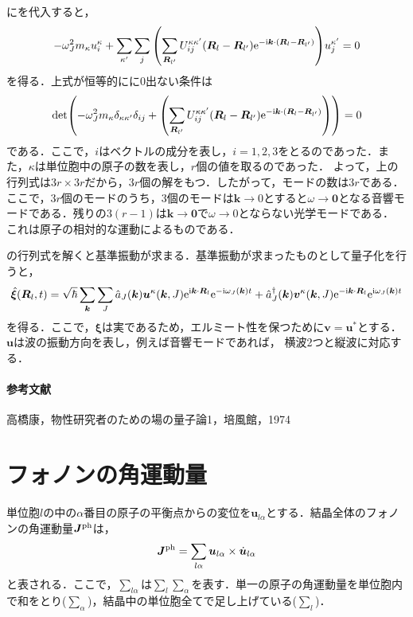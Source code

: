 \documentclass{report}
\begin{document}
にを代入すると，
\begin{align}
  -\omega_J^2 m_\kappa u_{i}^{\kappa} + \sum_{\kappa'} \sum_{j} \qty(\sum_{\bm{R}_{l'}} U_{ij}^{\kappa\kappa'}(\bm{R}_l - \bm{R}_{l'})\mathrm{e}^{-\mathrm{i}\bm{k}\cdot(\bm{R}_l-\bm{R}_{l'})}) u_j^{\kappa'}=0
\end{align}
を得る．上式が恒等的にに0出ない条件は
\begin{align}
  \det(-\omega_J^2 m_{\kappa}\delta_{\kappa\kappa'}\delta_{ij} + \qty(\sum_{\bm{R}_{l'}} U_{ij}^{\kappa\kappa'}(\bm{R}_l - \bm{R}_{l'})\mathrm{e}^{-\mathrm{i}\bm{k}\cdot(\bm{R}_l-\bm{R}_{l'})})) = 0 \label{det}
\end{align}
である．ここで，$i$はベクトルの成分を表し，$i=1,2,3$をとるのであった．また，$\kappa$は単位胞中の原子の数を表し，$r$個の値を取るのであった．
よって，上の行列式は$3r\times 3r$だから，$3r$個の解をもつ．したがって，モードの数は$3r$である．ここで，$3r$個のモードのうち，3個のモードは$\bm{k}\to0$とすると$\omega\to\bm{0}$となる音響モードである．残りの$3(r-1)$は$\bm{k}\to\bm{0}$で$\omega\to0$とならない光学モードである．
これは原子の相対的な運動によるものである．

の行列式を解くと基準振動が求まる．基準振動が求まったものとして量子化を行うと，
\begin{align}
  \hat{\bm{\xi}} (\bm{R}_l,t) = \sqrt{\hbar}\sum_{\bm{k}}\sum_{J} \hat{a}_J (\bm{k})\bm{u}^{\kappa}(\bm{k},J)\mathrm{e}^{\mathrm{i}\bm{k}\cdot\bm{R}_l}\mathrm{e}^{-\mathrm{i}\omega_J(\bm{k})t} + \hat{a}^{\dagger}_{J}(\bm{k})\bm{v}^{\kappa}(\bm{k},J)\mathrm{e}^{-\mathrm{i}\bm{k}\cdot\bm{R}_l}\mathrm{e}^{\mathrm{i}\omega_J(\bm{k})t}
\end{align}
を得る．ここで，$\bm{\xi}$は実であるため，エルミート性を保つために$\bm{v}=\bm{u}^{*}$とする．$\bm{u}$は波の振動方向を表し，例えば音響モードであれば，
横波2つと縦波に対応する．

\paragraph*{参考文献}
高橋康，物性研究者のための場の量子論1，培風館，1974

\section{フォノンの角運動量}
単位胞$l$の中の$\alpha$番目の原子の平衡点からの変位を$\bm{u}_{l\alpha}$とする．結晶全体のフォノンの角運動量$\bm{J}^{\mathrm{ph}}$は，
\begin{align}
  \bm{J}^{\mathrm{ph}} = \sum_{l\alpha} \bm{u}_{l\alpha} \times \dot{\bm{u}}_{l\alpha}
\end{align}
と表される．ここで，$\sum_{l\alpha}$は$\sum_{l}\sum_{\alpha}$を表す．単一の原子の角運動量を単位胞内で和をとり($\sum_{\alpha}$)，結晶中の単位胞全てで足し上げている($\sum_{l}$)．
\end{document}
